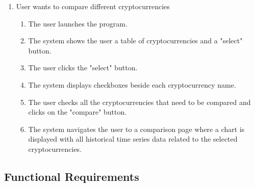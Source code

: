 \documentclass[12pt, titlepage]{article}
\begin{document}
\begin{enumerate}
    \item User wants to compare different cryptocurrencies
    \begin{enumerate}
        \item The user launches the program.
        \item The system shows the user a table of cryptocurrencies and a "select" button.
        \item The user clicks the "select" button.
        \item The system displays checkboxes beside each cryptocurrency name.
        \item The user checks all the cryptocurrencies that need to be compared and clicks on the "compare" button.
        \item The system navigates the user to a comparison page where a chart is displayed with all historical time series data related to the selected cryptocurrencies.
    \end{enumerate}
    
\end{enumerate}

\subsection{Functional Requirements}
\end{document}
